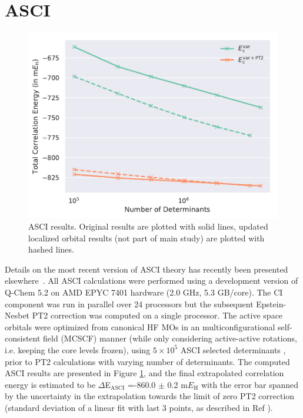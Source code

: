 \documentclass[journal=jcp,manuscript=suppinfo]{achemso}
\begin{document}
\section{ASCI}
\label{sec:asci}
%
\begin{figure}[ht!]
\begin{center}
\includegraphics[scale=0.75]{figures/asci/asci.pdf}
\caption{ASCI results. Original results are plotted with solid lines, updated localized orbital results (not part of main study) are plotted with hashed lines.}
\label{asci_SI_fig}
\end{center}
\vspace{-0.6cm}
\end{figure}
%
Details on the most recent version of ASCI theory has recently been presented elsewhere~\cite{tubman_whaley_selected_ci_jctc_2020,tubman_whaley_selected_ci_pt_arxiv_2018}. 
All ASCI calculations were performed using a development version of Q-Chem 5.2\cite{shao2015advances}  on AMD EPYC 7401 hardware (2.0 GHz, 5.3 GB/core). The CI component was run in parallel over 24 processors but the subsequent Epstein-Nesbet PT2 correction was computed on a single processor. The active space orbitals were optimized from canonical HF MOs in an multiconfigurational self-consistent field (MCSCF) manner (while only considering active-active rotations, i.e. keeping the core levels frozen), using $5\times 10^5$ ASCI selected determinants  \cite{levine2020casscf}, prior to PT2 calculations with varying number of determinants. The computed ASCI results are presented in  Figure \ref{asci_SI_fig}, and the final extrapolated correlation energy is estimated to be $\Delta$E$_\textrm{ASCI}$ =-860.0 $\pm$ 0.2 m$E_{\text{H}}$ with the error bar spanned by the uncertainty in the extrapolation towards the limit of zero PT2 correction (standard deviation of a linear fit with last 3 points, as described in Ref ).
\end{document}
